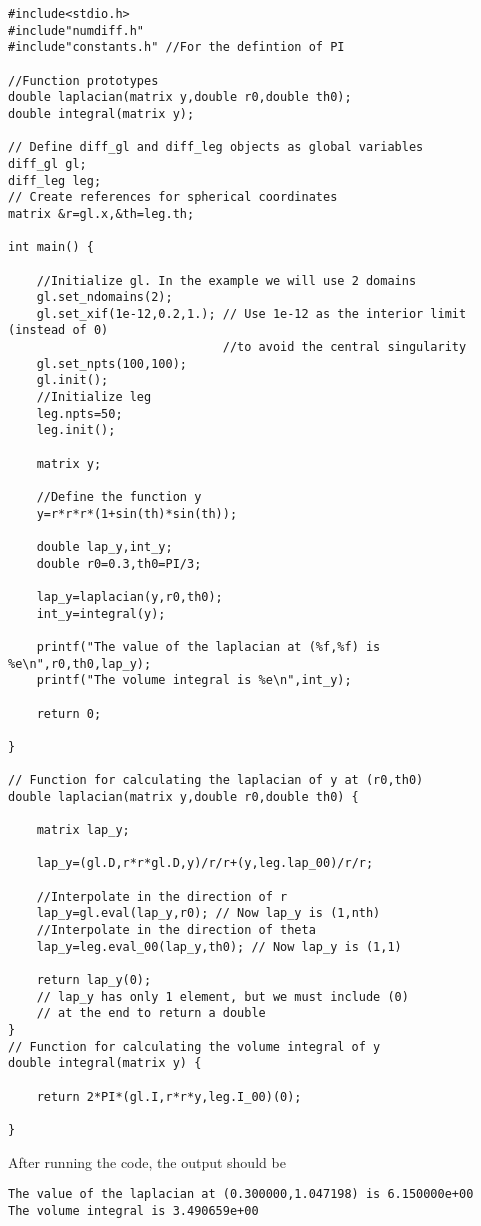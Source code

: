 \begin{verbatim}
#include<stdio.h>
#include"numdiff.h"
#include"constants.h" //For the defintion of PI

//Function prototypes
double laplacian(matrix y,double r0,double th0);
double integral(matrix y);

// Define diff_gl and diff_leg objects as global variables
diff_gl gl; 
diff_leg leg;
// Create references for spherical coordinates
matrix &r=gl.x,&th=leg.th;

int main() {

	//Initialize gl. In the example we will use 2 domains
	gl.set_ndomains(2);
	gl.set_xif(1e-12,0.2,1.); // Use 1e-12 as the interior limit (instead of 0)
							  //to avoid the central singularity
	gl.set_npts(100,100);
	gl.init();
	//Initialize leg
	leg.npts=50;
	leg.init();
	
	matrix y;
	
	//Define the function y
	y=r*r*r*(1+sin(th)*sin(th));
	
	double lap_y,int_y;
	double r0=0.3,th0=PI/3;
	
	lap_y=laplacian(y,r0,th0);
	int_y=integral(y);
	
	printf("The value of the laplacian at (%f,%f) is %e\n",r0,th0,lap_y);
	printf("The volume integral is %e\n",int_y);
	
	return 0;	
	
}

// Function for calculating the laplacian of y at (r0,th0)
double laplacian(matrix y,double r0,double th0) {

	matrix lap_y;
	
	lap_y=(gl.D,r*r*gl.D,y)/r/r+(y,leg.lap_00)/r/r;
	
	//Interpolate in the direction of r
	lap_y=gl.eval(lap_y,r0); // Now lap_y is (1,nth)
	//Interpolate in the direction of theta
	lap_y=leg.eval_00(lap_y,th0); // Now lap_y is (1,1)
	
	return lap_y(0);
	// lap_y has only 1 element, but we must include (0) 
	// at the end to return a double
}
// Function for calculating the volume integral of y
double integral(matrix y) {

	return 2*PI*(gl.I,r*r*y,leg.I_00)(0);

}

\end{verbatim}

After running the code, the output should be

\begin{verbatim}
The value of the laplacian at (0.300000,1.047198) is 6.150000e+00
The volume integral is 3.490659e+00
\end{verbatim}

